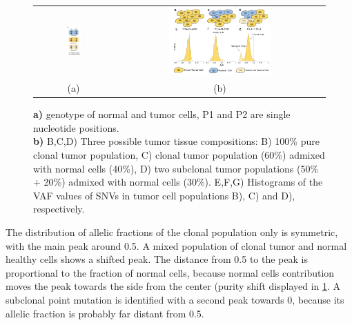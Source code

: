 \begin{figure}[H]
\centering
\begin{tabular}{cc}
  \includegraphics[width=0.2\textwidth]{SNVs.png} &   \includegraphics[width=0.5\textwidth]{peaks.png} \\
(a)  & (b)  \\[6pt]
\end{tabular}
\caption{\textbf{a)} genotype of normal and tumor cells, P1 and P2 are single nucleotide positions. \\
\textbf{b)} B,C,D) Three possible tumor tissue compositions: B)
100\% pure clonal tumor population, C) clonal tumor population (60\%) admixed with normal cells (40\%), D) two subclonal tumor
populations (50\% + 20\%) admixed with normal cells (30\%). E,F,G) Histograms of the VAF values of SNVs in tumor cell populations
B), C) and D), respectively.}
\label{fig:cluster}
\end{figure}

The distribution of allelic fractions of the clonal population only is symmetric, with the main peak around 0.5. A mixed population of clonal tumor and normal healthy cells shows a shifted peak.
The distance from 0.5 to the peak is proportional to the fraction of normal cells, because normal cells contribution moves the peak towards the side from the center (purity shift displayed in \ref{fig:cluster}.
A subclonal point mutation is identified with a second peak towards 0, because its allelic fraction is probably far distant from 0.5.

